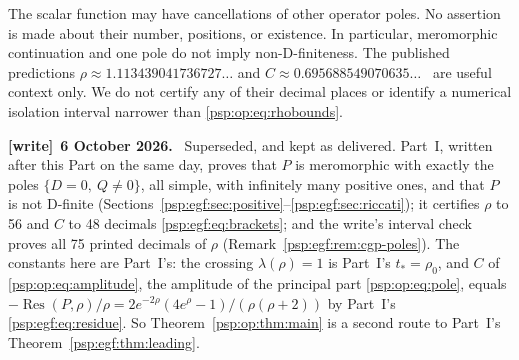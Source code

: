 \documentclass[11pt,letterpaper]{article}
\numberwithin{equation}{section}
\theoremstyle{remark}\newtheorem{remark}[theorem]{Remark}
\newcommand{\Res}{\operatorname{Res}}
\newenvironment{writenote}[1][]{\par\smallskip\begingroup\small
 \noindent\textbf{[write]}\if\relax\detokenize{#1}\relax\else~\textbf{#1.}\fi\ }%
 {\par\endgroup\smallskip}
\begin{document}
The scalar function may have cancellations of other operator poles.
No assertion is made about their number, positions, or existence.
In particular, meromorphic continuation and one pole do not imply
non-D-finiteness. The published predictions
$\rho\approx1.113439041736727\ldots$ and
$C\approx0.695688549070635\ldots$~\cite[Section 3.3]{cgp}
are useful context only. We do not certify any of their decimal places
or identify a numerical isolation interval narrower than
\eqref{psp:op:eq:rhobounds}.
\begin{writenote}[6 October 2026]
Superseded, and kept as delivered. Part~I, written after this Part on the same day, proves that $P$ is meromorphic with exactly the poles $\{D=0,\ Q\ne0\}$, all simple, with infinitely many positive ones, and that $P$ is not D-finite (Sections~\ref{psp:egf:sec:positive}--\ref{psp:egf:sec:riccati}); it certifies $\rho$ to 56 and $C$ to 48 decimals \eqref{psp:egf:eq:brackets}; and the write's interval check proves all 75 printed decimals of $\rho$ (Remark~\ref{psp:egf:rem:cgp-poles}). The constants here are Part~I's: the crossing $\lambda(\rho)=1$ is Part~I's $t_*=\rho_0$, and $C$ of \eqref{psp:op:eq:amplitude}, the amplitude of the principal part \eqref{psp:op:eq:pole}, equals $-\Res(P,\rho)/\rho=2e^{-2\rho}(4e^\rho-1)/(\rho(\rho+2))$ by Part~I's \eqref{psp:egf:eq:residue}. So Theorem~\ref{psp:op:thm:main} is a second route to Part~I's Theorem~\ref{psp:egf:thm:leading}.
\end{writenote}
\end{document}
